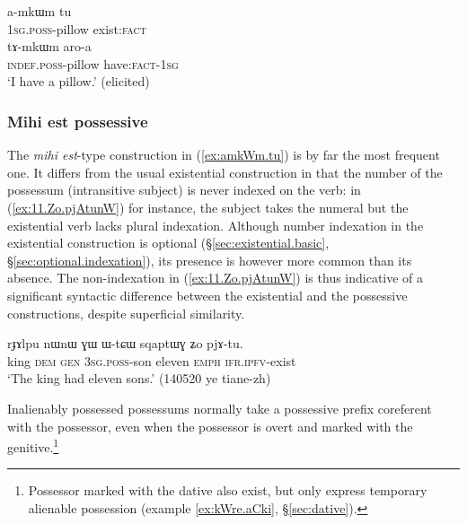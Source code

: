 \begin{exe}
\ex \label{ex:have.pillow}
\begin{xlist}
\ex \label{ex:amkWm.tu}
\gll a-mkɯm tu \\
\textsc{1sg}.\textsc{poss}-pillow exist:\textsc{fact} \\
\ex \label{ex:tamkWm.aroa}
\gll tɤ-mkɯm aro-a \\
\textsc{indef}.\textsc{poss}-pillow have:\textsc{fact}-\textsc{1sg} \\
\glt `I have a pillow.' (elicited)
\end{xlist}
\end{exe}
 
  
 \subsubsection{Mihi est possessive} \label{sec:possessive.mihi.est}
    
The \textit{mihi est}-type construction in (\ref{ex:amkWm.tu}) is by far the most frequent one.  It differs from the usual existential construction in that the number of the possessum (intransitive subject) is never indexed on the verb: in (\ref{ex:11.Zo.pjAtunW}) for instance, the subject  takes the numeral  but the existential verb  lacks plural indexation. Although number indexation in the existential construction is optional (§\ref{sec:existential.basic}, §\ref{sec:optional.indexation}), its presence is however more common than its absence. The non-indexation in (\ref{ex:11.Zo.pjAtunW}) is thus indicative of a significant syntactic difference between the existential and the possessive constructions, despite superficial similarity.
  
\begin{exe}
\ex \label{ex:11.Zo.pjAtunW}
\gll   rɟɤlpu nɯnɯ ɣɯ ɯ-tɕɯ sqaptɯɣ ʑo pjɤ-tu. \\
king \textsc{dem} \textsc{gen}  \textsc{3sg}.\textsc{poss}-son eleven \textsc{emph} \textsc{ifr}.\textsc{ipfv}-exist  \\
\glt `The king had eleven sons.' (140520 ye tiane-zh)
 \end{exe}
 
Inalienably possessed possessums normally take a possessive prefix coreferent with the possessor, even when the possessor is overt and marked with the genitive.\footnote{Possessor marked with the dative also exist, but only express temporary alienable possession (example \ref{ex:kWre.aCki}, §\ref{sec:dative}). } 

